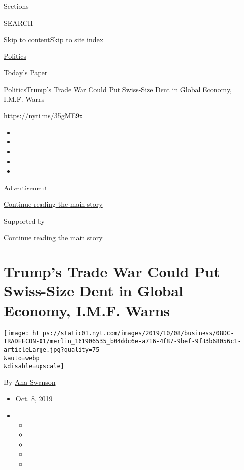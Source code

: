Sections

SEARCH

\protect\hyperlink{site-content}{Skip to
content}\protect\hyperlink{site-index}{Skip to site index}

\href{https://www.nytimes.com/section/politics}{Politics}

\href{https://myaccount.nytimes.com/auth/login?response_type=cookie\&client_id=vi}{}

\href{https://www.nytimes.com/section/todayspaper}{Today's Paper}

\href{/section/politics}{Politics}\textbar{}Trump's Trade War Could Put
Swiss-Size Dent in Global Economy, I.M.F. Warns

\url{https://nyti.ms/35gME9x}

\begin{itemize}
\item
\item
\item
\item
\item
\end{itemize}

Advertisement

\protect\hyperlink{after-top}{Continue reading the main story}

Supported by

\protect\hyperlink{after-sponsor}{Continue reading the main story}

\hypertarget{trumps-trade-war-could-put-swiss-size-dent-in-global-economy-imf-warns}{%
\section{Trump's Trade War Could Put Swiss-Size Dent in Global Economy,
I.M.F.
Warns}\label{trumps-trade-war-could-put-swiss-size-dent-in-global-economy-imf-warns}}

\texttt{[image: https://static01.nyt.com/images/2019/10/08/business/08DC-TRADEECON-01/merlin\_161906535\_b04ddc6e-a716-4f87-9bef-9f83b68056c1-articleLarge.jpg?quality=75\\\&auto=webp\\\&disable=upscale]}

By \href{https://www.nytimes.com/by/ana-swanson}{Ana Swanson}

\begin{itemize}
\item
  Oct. 8, 2019
\item
  \begin{itemize}
  \item
  \item
  \item
  \item
  \item
  \end{itemize}
\end{itemize}

